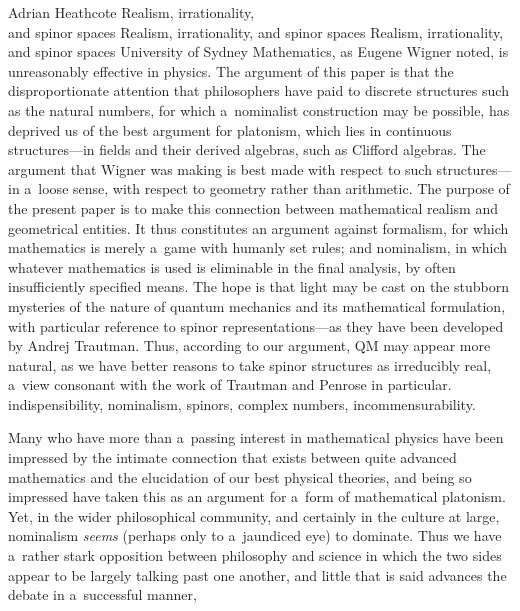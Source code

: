 \begin{artengenv}{Adrian Heathcote}
	{Realism, irrationality,\\and spinor spaces}
	{Realism, irrationality, and spinor spaces}
	{Realism, irrationality, and spinor spaces}
	{University of Sydney}
	{Mathematics, as Eugene Wigner noted, is unreasonably effective in physics. The argument of this paper is that the disproportionate attention that philosophers have paid to discrete structures such as the natural numbers, for which a~nominalist construction may be possible, has deprived us of the best argument for platonism, which lies in continuous structures---in fields and their derived algebras, such as Clifford algebras. The argument that Wigner was making is best made with respect to such structures---in a~loose sense, with respect to geometry rather than arithmetic. The purpose of the present paper is to make this connection between mathematical realism and geometrical entities. It thus constitutes an argument against formalism, for which mathematics is merely a~game with humanly set rules; and nominalism, in which whatever mathematics is used is eliminable in the final analysis, by often insufficiently specified means. The hope is that light may be cast on the stubborn mysteries of the nature of quantum mechanics and its mathematical formulation, with particular reference to spinor representations---as they have been developed by Andrej Trautman. Thus, according to our argument, QM may appear more natural, as we have better reasons to take spinor structures as irreducibly real, a~view consonant with the work of Trautman and Penrose in particular.
	}
	{indispensibility, nominalism, spinors, complex numbers, incommensurability.}




\lettrine[loversize=0.13,lines=2,lraise=-0.03,nindent=0em,findent=0.2pt]%
{M}{}any who have more than a~passing interest in mathematical physics have been impressed by the intimate connection that exists between quite advanced mathematics and the elucidation of our best physical theories, and being so impressed have taken this as an argument for a~form of mathematical platonism. Yet, in the wider philosophical community, and certainly in the culture at large, nominalism \textit{seems} (perhaps only to a~jaundiced eye) to dominate. Thus we have a~rather stark opposition between philosophy and science in which the two sides appear to be largely talking past one another, and little that is said advances the debate in a~successful manner,


\end{artengenv}
